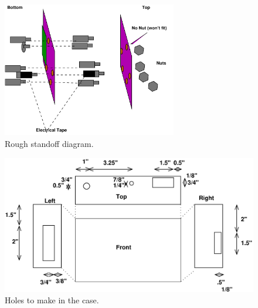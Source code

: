 \documentclass[11pt]{article}
\begin{document}
\begin{figure}[tbp]
\centering
\includegraphics[width=3in]{figs/standoffs}
\caption{Rough standoff diagram.~\label{figure:standoffs}}
\end{figure}


\begin{figure}[tbp]
\includegraphics[width=\columnwidth]{figs/holes}
\caption{Holes to make in the case.~\label{figure:holes}}
\end{figure}
\end{document}
